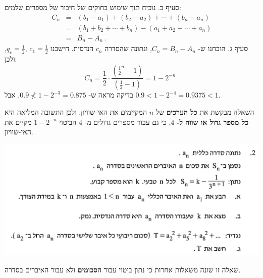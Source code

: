 \documentclass[12pt,a4paper]{article}
\begin{document}
סעיף ב. נוכיח תוך שימוש בחוקים של חיבור של מספרים שלמים:
\begin{eqnarray*}
C_n &=& (b_1-a_1) + (b_2 - a_2) + \cdots + (b_n-a_n)\\
&=&(b_1 + b_2 + \cdots + b_n) - (a_1 + a_2 + \cdots + a_n)\\
&=& B_n - A_n\,.
\end{eqnarray*}
סעיף ג. הוכחנו ש-%
$C_n=B_n-A_n$,
ונתונה שהסדרה 
$c_n$
הנדסית. חישבנו 
$q_c=\frac{1}{2},\,c_1=\frac{1}{2}$,
ולכן:
\[
C_n = \frac{1}{2}\cdot\frac{\displaystyle\left(\frac{1}{2}^n-1\right)}{\displaystyle\left(\frac{1}{2}-1\right)}=1-2^{-n}\,.
\]
בדיקה מראה ש-%
$0.9 \not< 1-2^{-3}=0.875$,
אבל
$0.9 < 1-2^{-4}=0.9375 < 1$.

השאלה מבקשת את
\textbf{כל הערכים}
של
$n$
המקיימים את האי-שוויון, ולכן התשובה המליאה היא 
\textbf{כל מספר גדול או שווה ל-}%
$4$,
כי גם עבור מספרים גדולים מ-%
$4$
הביטוי
$1-2^{-n}$
מקיים את האי-שוויון.


\bigskip

\textbf{}

\begin{center}
\includegraphics[width=.95\textwidth]{summer-2017b-2}
\end{center}

שאלה זו שונה משאלות אחרות כי נתון ביטוי עבור
\textbf{הסכומים}
ולא עבור האיברים בסדרה.
\end{document}
